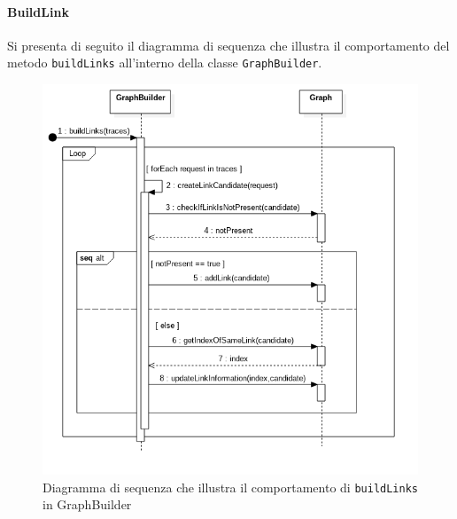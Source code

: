 \paragraph{BuildLink} \Spazio
Si presenta di seguito il diagramma di sequenza che illustra il comportamento del metodo \texttt{buildLinks} all'interno della classe \texttt{GraphBuilder}.
\begin{figure}[H]
	\centering
	\includegraphics[width=1\textwidth]{Images/SequenceBuildLinks.png}
	\caption{Diagramma di sequenza che illustra il comportamento di \texttt{buildLinks} in GraphBuilder}
	\label{img:sequenceBuildLinks}
\end{figure}

